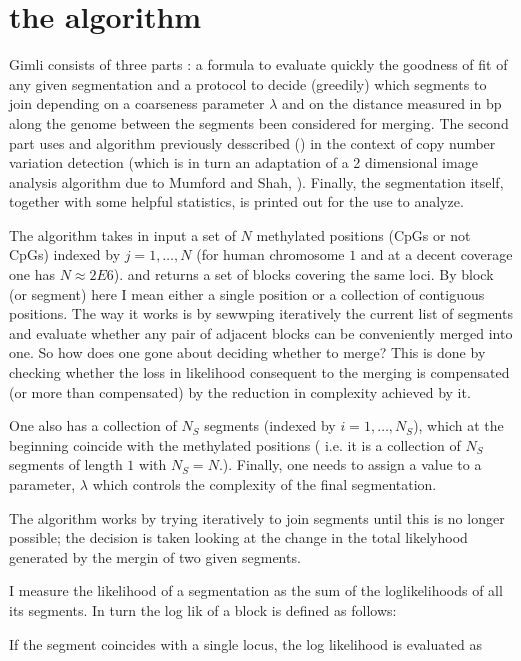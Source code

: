 \documentclass[11pt]{amsart}
\begin{document}
\section{the algorithm}

Gimli consists of three parts : a formula to evaluate quickly the 
goodness of fit of any given segmentation
and a protocol to decide (greedily) which  segments to join depending 
on a coarseness parameter $\lambda$ and on the distance measured in bp along
the genome between the segments been considered for merging. 
The second part uses and  algorithm previously desscribed   (\cite{vega}) in 
the context of copy number variation detection (which is in turn an adaptation 
of a 2 dimensional image analysis algorithm due to Mumford and Shah, 
\cite{mumfordshah}). Finally, the segmentation itself, together with some 
helpful statistics, is printed out for the use to analyze.

The algorithm takes in input a set of $N$ methylated positions 
(CpGs or not CpGs) indexed by $j=1,\dots,N$ 
(for human chromosome $1$ and at a 
decent coverage one has $N \approx 2E6$).
and returns a set of blocks covering the same loci.
By block (or segment) here I mean either a single position or a collection
of contiguous positions. The way it works is by sewwping
iteratively the current list of segments and evaluate whether any pair 
of adjacent blocks can be conveniently merged into one. So how does one gone about
deciding whether to merge? This is  done by checking whether the loss in 
likelihood consequent to the merging is compensated (or more than compensated)
by the reduction in complexity achieved by it.

One also has a collection of $N_S$ 
segments (indexed by $i=1,\dots,N_S$), 
which at the beginning
coincide with the methylated positions ( i.e. it is a collection of $N_S$ 
segments of length $1$ with $N_S=N$.).
Finally, one needs to assign a value to a parameter, $\lambda$ which controls the 
complexity of the final segmentation.

The algorithm works by trying iteratively to join segments until this
is no longer possible; the decision is taken looking at the change
in the total likelyhood generated by the mergin of two given segments. 

I measure the likelihood of a segmentation as the sum of the loglikelihoods
of all its segments. In turn the log lik of a block is defined as follows:

If the
segment coincides with a single locus, 
the log likelihood  is evaluated as 
\end{document}
